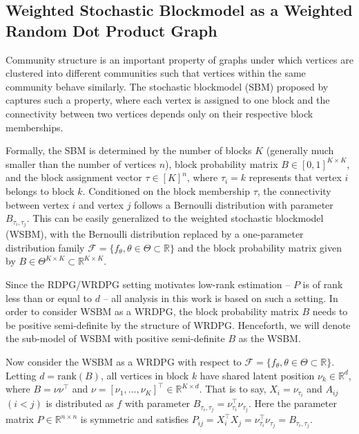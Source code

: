 \documentclass[a4paper]{article}
\begin{document}
\subsection{Weighted Stochastic Blockmodel as a Weighted Random Dot Product Graph}
\label{section:WSBM}

Community structure is an important property of graphs under which vertices are clustered into different communities such that vertices within the same community behave similarly. The stochastic blockmodel (SBM) proposed by \citet{holland1983stochastic} captures such a property, where each vertex is assigned to one block and the connectivity between two vertices depends only on their respective block memberships.

Formally, the SBM is determined by the number of blocks $K$ (generally much smaller than the number of vertices $n$), block probability matrix $B \in [0, 1]^{K \times K}$, and the block assignment vector $\tau \in [K]^n$, where $\tau_i = k$ represents that vertex $i$ belongs to block $k$. Conditioned on the block membership $\tau$, the connectivity between vertex $i$ and vertex $j$ follows a Bernoulli distribution with parameter $B_{\tau_i, \tau_j}$. This can be easily generalized to the weighted stochastic blockmodel (WSBM), with the Bernoulli distribution replaced by a one-parameter distribution family $\mathcal{F} = \{ f_{\theta}, \theta \in \Theta \subset \mathbb{R} \}$ and the block probability matrix given by $B \in \Theta^{K \times K} \subset \mathbb{R}^{K \times K}$.

Since the RDPG/WRDPG setting motivates low-rank estimation -- $P$ is of rank less than or equal to $d$ -- all analysis in this work is based on such a setting. In order to consider WSBM as a WRDPG, the block probability matrix $B$ needs to be positive semi-definite by the structure of WRDPG. Henceforth, we will denote the sub-model of WSBM with positive semi-definite $B$ as the WSBM.

Now consider the WSBM as a WRDPG with respect to $\mathcal{F} = \{ f_{\theta}, \theta \in \Theta \subset \mathbb{R} \}$. Letting $d = 
\mathrm{rank}(B)$, all vertices in block $k$ have shared latent position $\nu_k \in \mathbb{R}^{d}$, where $B = \nu \nu^{\top}$ and $\nu = [\nu_1, \dotsc, \nu_K]^{\top} \in \mathbb{R}^{K \times d}$. That is to say, $X_i = \nu_{\tau_i}$ and $A_{ij}$ $(i < j)$ is distributed as $f$ with parameter $B_{\tau_i, \tau_j} = \nu_{\tau_i}^{\top} \nu_{\tau_j}$. Here the parameter matrix $P \in \mathbb{R}^{n \times n}$ is symmetric and satisfies $P_{ij} = X_i^{\top} X_j = \nu_{\tau_i}^{\top} \nu_{\tau_j} = B_{\tau_i, \tau_j}$.
\end{document}
